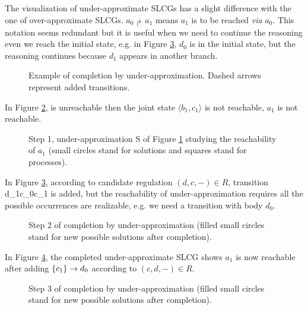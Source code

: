 The visualization of under-approximate SLCGs has a slight difference with the one of over-approximate SLCGs.
$a_0\Rsh a_1$ means $a_1$ is to be reached \textit{via} $a_0$.
This notation seems redundant but it is useful when we need to continue the reasoning even we reach the initial state, e.g. in Figure \ref{Under2}, $d_0$ is in the initial state, but the reasoning continues because $d_1$ appears in another branch.

\begin{figure}[ht]
\centering

\caption[Completion by under-approximation]{Example of completion by under-approximation. Dashed arrows represent added transitions.}\label{ExUnder}
\end{figure}

In Figure \ref{Under1},  is unreachable then the joint state $\langle b_1, c_1\rangle$ is not reachable, $a_1$ is not reachable.

\begin{figure}[ht]
\centering

\caption[Operations on SLCG(1)]{Step 1, under-approximation S of Figure \ref{ExUnder} studying the reachability of $a_1$ (small circles stand for solutions and squares stand for processes). }\label{Under1}
\end{figure}

In Figure \ref{Under2}, according to candidate regulation ${(d,c,-)}\in R$, transition \ac{d_1}{c_0}{c_1} is added, but the reachability of under-approximation requires all the possible occurrences are realizable, e.g. we need a transition with body $d_0$.

\begin{figure}[ht]
\centering

\caption[Operations on SLCG(2)]{Step 2 of completion by under-approximation (filled small circles stand for new possible solutions after completion).}\label{Under2}
\end{figure}

In Figure \ref{Under3}, the completed under-approximate SLCG shows $a_1$ is now reachable after adding $\acm{c_1}{d_1}{d_0}$ according to ${(c,d,-)}\in R$.

\begin{figure}[ht]
\centering

\caption[Operations on SLCG(3)]{Step 3 of completion by under-approximation (filled small circles stand for new possible solutions after completion).}\label{Under3}
\end{figure}

